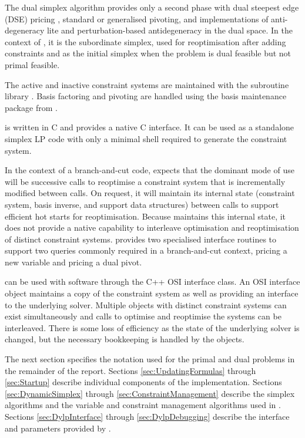 The dual simplex algorithm provides only a second phase with
dual steepest edge (DSE) pricing \cite[algorithm `steepest 1']{For92},
standard or generalised pivoting,
and implementations of anti-degeneracy lite and perturbation-based
antidegeneracy in the dual space.
In the context of \dylp, it is the subordinate simplex, used for
reoptimisation after adding constraints and as the initial simplex when the
problem is dual feasible but not primal feasible.

The active and inactive constraint systems are maintained with the \consys
subroutine library \cite{Haf98b}.
Basis factoring and pivoting are handled using the basis maintenance package
from \glpk \cite{GLPK,Mak01}.

\dylp is written in C and provides a native C interface.
It can be used as a standalone simplex LP code with only a minimal shell
required to generate the constraint system.

In the context of a branch-and-cut code, \dylp expects that the dominant
mode of use will be successive calls to
reoptimise a constraint system that is incrementally modified between calls.
On request, it will maintain its internal state (constraint system,
basis inverse, and support data structures) between calls to support
efficient hot starts for reoptimisation.
Because \dylp maintains this internal state, it does not provide a native
capability to interleave optimisation and reoptimisation of distinct
constraint systems.
\dylp provides two specialised interface routines to support two queries
commonly required in
a branch-and-cut context, pricing a new variable and pricing a dual pivot.

\dylp can be used with \coin \cite{COIN} software through
the C++  OSI interface class.
An OSI interface object maintains a copy of the constraint system as
well as providing an interface to the underlying solver.
Multiple  objects with distinct constraint systems can exist
simultaneously and calls to optimise and reoptimise the systems can be
interleaved.
There is some loss of efficiency as the state of the underlying solver is
changed, but the necessary bookkeeping is handled by the 
objects.

The next section specifies the notation used for the
primal and dual problems in the remainder of the report.
Sections \ref{sec:UpdatingFormulas} through \ref{sec:Startup}
describe individual components of the implementation.
Sections \ref{sec:DynamicSimplex} through \ref{sec:ConstraintManagement}
describe the simplex algorithms and the variable and constraint management
algorithms used in \dylp.
Sections \ref{sec:DylpInterface} through \ref{sec:DylpDebugging} describe
the interface and parameters provided by \dylp.
